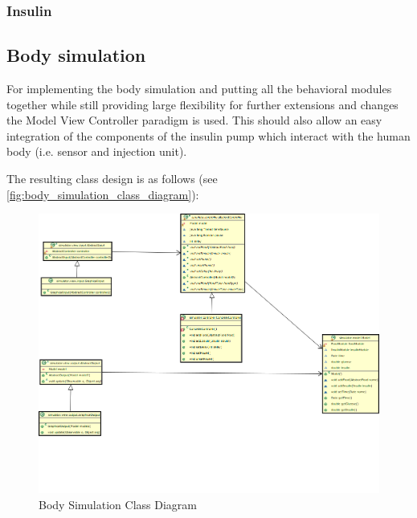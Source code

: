 \subsubsection{Insulin}

\newpage
\subsection{Body simulation}
For implementing the body simulation and putting all the behavioral modules
together while still providing large flexibility for further extensions and
changes the Model View Controller paradigm is used.
This should also allow an easy integration of the components of the insulin
pump which interact with the human body (i.e. sensor and injection unit).

The resulting class design is as follows  (see
\vref{fig:body_simulation_class_diagram}): 

\begin{figure}[htb]
\centering
\includegraphics[width=\textwidth]{images/body_simulation_classdiagram.png}
\caption{Body Simulation Class Diagram}
\label{fig:body_simulation_class_diagram}
\end{figure}